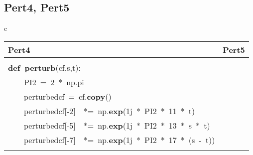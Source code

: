 \documentclass{article}\usepackage[]{graphicx}\usepackage[dvipsnames,table]{xcolor}
\makeatletter
\newcommand{\hlnum}[1]{\textcolor[rgb]{0.686,0.059,0.569}{#1}}%
\newcommand{\hlopt}[1]{\textcolor[rgb]{0,0,0}{#1}}%
\newcommand{\hldef}[1]{\textcolor[rgb]{0.345,0.345,0.345}{#1}}%
\newcommand{\hlkwa}[1]{\textcolor[rgb]{0.161,0.373,0.58}{\textbf{#1}}}%
\newcommand{\hlkwb}[1]{\textcolor[rgb]{0.69,0.353,0.396}{#1}}%
\newcommand{\hlkwd}[1]{\textcolor[rgb]{0.737,0.353,0.396}{\textbf{#1}}}%
\newenvironment{kframe}{%
 \def\at@end@of@kframe{}%
 \ifinner\ifhmode%
  \def\at@end@of@kframe{\end{minipage}}%
  \begin{minipage}{\columnwidth}%
 \fi\fi%
 \def\FrameCommand##1{\hskip\@totalleftmargin \hskip-\fboxsep
 \colorbox{shadecolor}{##1}\hskip-\fboxsep
     \hskip-\linewidth \hskip-\@totalleftmargin \hskip\columnwidth}%
 \MakeFramed {\advance\hsize-\width
   \@totalleftmargin\z@ \linewidth\hsize
   \@setminipage}}%
 {\par\unskip\endMakeFramed%
 \at@end@of@kframe}
\newenvironment{knitrout}{}{} %
\makeatother
\begin{document}
\subsection{Pert4, Pert5}
\begin{center}
\begin{tabular}{c}
\begin{tabular}{m{10cm}m{10cm}}
\toprule
Pert4 & Pert5 \\
\midrule
\begin{minipage}[m]{10cm}
\begin{knitrout}\tiny
\definecolor{shadecolor}{rgb}{0.969, 0.969, 0.969}\color{fgcolor}\begin{kframe}
\noindent
\ttfamily
\hldef{}\hlkwb{@njit}\hspace*{\fill}\\
\hldef{}\hlkwa{def\ }\hldef{}\hlkwd{perturb\textunderscore 4}\hldef{}\hlopt{(}\hldef{cf}\hlopt{,}\hldef{s}\hlopt{,}\hldef{t}\hlopt{):}\hspace*{\fill}\\
\hldef{}\hldef{\ \ \ \ }\hldef{PI2\ }\hlopt{=\ }\hldef{}\hlnum{2\ }\hldef{}\hlopt{{*}\ }\hldef{np}\hlopt{.}\hldef{pi}\hspace*{\fill}\\
\hldef{}\hldef{\ \ \ \ }\hldef{perturbed\textunderscore cf\ }\hlopt{=\ }\hldef{cf}\hlopt{.}\hldef{}\hlkwd{copy}\hldef{}\hlopt{()}\hspace*{\fill}\\
\hldef{}\hldef{\ \ \ \ }\hldef{perturbed\textunderscore cf}\hlopt{{[}{-}}\hldef{}\hlnum{2}\hldef{}\hlopt{{]}}\hldef{\ \ }\hlopt{{*}=\ }\hldef{np}\hlopt{.}\hldef{}\hlkwd{exp}\hldef{}\hlopt{(}\hldef{}\hlnum{1}\hldef{j\ }\hlopt{{*}\ }\hldef{PI2\ }\hlopt{{*}\ }\hldef{}\hlnum{11\ }\hldef{}\hlopt{{*}\ }\hldef{t}\hlopt{)}\hspace*{\fill}\\
\hldef{}\hldef{\ \ \ \ }\hldef{perturbed\textunderscore cf}\hlopt{{[}{-}}\hldef{}\hlnum{5}\hldef{}\hlopt{{]}}\hldef{\ \ }\hlopt{{*}=\ }\hldef{np}\hlopt{.}\hldef{}\hlkwd{exp}\hldef{}\hlopt{(}\hldef{}\hlnum{1}\hldef{j\ }\hlopt{{*}\ }\hldef{PI2\ }\hlopt{{*}\ }\hldef{}\hlnum{13\ }\hldef{}\hlopt{{*}\ }\hldef{s\ }\hlopt{{*}\ }\hldef{t}\hlopt{)}\hspace*{\fill}\\
\hldef{}\hldef{\ \ \ \ }\hldef{perturbed\textunderscore cf}\hlopt{{[}{-}}\hldef{}\hlnum{7}\hldef{}\hlopt{{]}}\hldef{\ \ }\hlopt{{*}=\ }\hldef{np}\hlopt{.}\hldef{}\hlkwd{exp}\hldef{}\hlopt{(}\hldef{}\hlnum{1}\hldef{j\ }\hlopt{{*}\ }\hldef{PI2\ }\hlopt{{*}\ }\hldef{}\hlnum{17\ }\hldef{}\hlopt{{*}\ (}\hldef{s\ }\hlopt{{-}\ }\hldef{t}\hlopt{))}\hspace*{\fill}\\

\end{kframe}
\end{knitrout}
\end{minipage}
\end{tabular}
\end{tabular}
\end{center}
\end{document}
